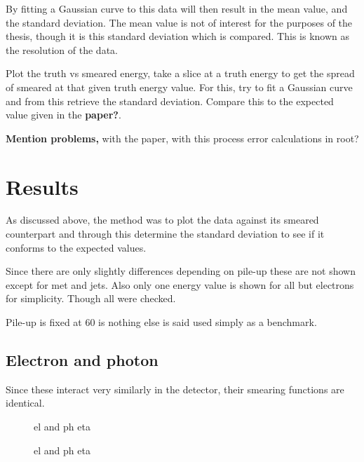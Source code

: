By fitting a Gaussian curve to this data will then result in the mean value, and the standard deviation. The mean value is not of interest for the purposes of the thesis, though it is this standard deviation which is compared. This is known as the resolution of the data.

Plot the truth vs smeared energy, take a slice at a truth energy to get the spread of smeared at that given truth energy value. For this, try to fit a Gaussian curve and from this retrieve the standard deviation. Compare this to the expected value given in the \textbf{paper?}.

\textbf{Mention problems,} with the paper, with this process error calculations in root?

\section{Results}\label{cha:vali:sec:results}
As discussed above, the method was to plot the data against its smeared counterpart and through this determine the standard deviation to see if it conforms to the expected values.

Since there are only slightly differences depending on pile-up these are not shown except for met and jets. Also only one energy value is shown for all but electrons for simplicity. Though all were checked.

Pile-up is fixed at 60 is nothing else is said used simply as a benchmark.
\subsection{Electron and photon}
Since these interact very  similarly in the detector, their smearing functions are identical.
\begin{figure}[!htbp]
  \centering 
\hfill
  \caption{el and ph eta}
  \label{fig:elph}
\end{figure}

\begin{figure}[!htbp]
  \ContinuedFloat 
  \centering 
  \hfill
  \setcounter{figure}{1}
  \caption[]{el and ph eta}
  \label{fig:elph}
\end{figure} 
\setcounter{figure}{1}

